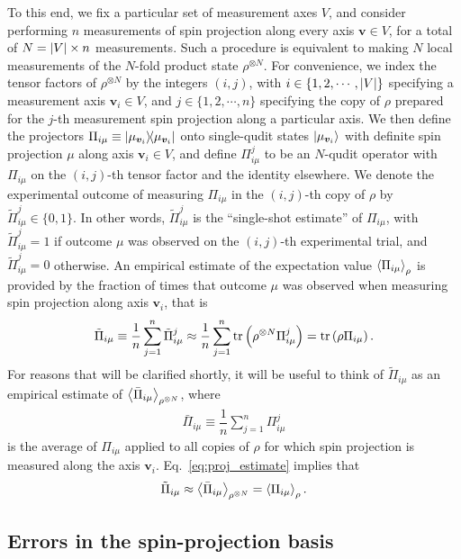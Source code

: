 \documentclass[a4paper,twocolumn,unpublished]{quantumarticle}
\newcommand{\f}[2]{\dfrac{#1}{#2}} %
\newcommand{\p}[1]{\left(#1\right)} %
\newcommand{\bk}{\Braket} %
\renewcommand{\set}[1]{\{#1\}} %
\begin{document}
To this end, we fix a particular set of measurement axes $V$, and consider performing $n$ measurements of spin projection along every axis $\bm v\in V$, for a total of $N=\abs{V}\times n$ measurements.
Such a procedure is equivalent to making $N$ local measurements of the $N$-fold product state $\rho^{\otimes N}$.
For convenience, we index the tensor factors of $\rho^{\otimes N}$ by the integers $\p{i,j}$, with $i\in\set{1,2,\cdots,\abs{V}}$ specifying a measurement axis $\bm v_i\in V$, and $j\in\set{1,2,\cdots,n}$ specifying the copy of $\rho$ prepared for the $j$-th measurement spin projection along a particular axis.
We then define the projectors $\Pi_{i\mu}\equiv\op{\mu_{\bm v_i}}$ onto single-qudit states $\ket{\mu_{\bm v_i}}$ with definite spin projection $\mu$ along axis $\bm v_i\in V$, and define $\Pi_{i\mu}^j$ to be an $N$-qudit operator with $\Pi_{i\mu}$ on the $\p{i,j}$-th tensor factor and the identity elsewhere.
We denote the experimental outcome of measuring $\Pi_{i\mu}$ in the $\p{i,j}$-th copy of $\rho$ by $\tilde\Pi_{i\mu}^j\in\set{0,1}$.
In other words, $\tilde\Pi_{i\mu}^j$ is the ``single-shot estimate'' of $\Pi_{i\mu}$, with $\tilde\Pi_{i\mu}^j=1$ if outcome $\mu$ was observed on the $\p{i,j}$-th experimental trial, and $\tilde\Pi_{i\mu}^j=0$ otherwise.
An empirical estimate of the expectation value $\bk{\Pi_{i\mu}}_\rho$ is provided by the fraction of times that outcome $\mu$ was observed when measuring spin projection along axis $\bm v_i$, that is
\begin{align}
  \tilde\Pi_{i\mu} \equiv \f1n \sum_{j=1}^n \tilde\Pi_{i\mu}^j
  \approx \f1n \sum_{j=1}^n \tr\p{\rho^{\otimes N} \Pi_{i\mu}^j}
  = \tr\p{\rho \Pi_{i\mu}}.
  \label{eq:proj_estimate}
\end{align}
For reasons that will be clarified shortly, it will be useful to think of $\tilde\Pi_{i\mu}$ as an empirical estimate of $\bk{\bar\Pi_{i\mu}}_{\rho^{\otimes N}}$, where
\begin{align}
  \bar\Pi_{i\mu} \equiv \f1n \sum_{j=1}^n \Pi_{i\mu}^j
  \label{eq:mean_proj}
\end{align}
is the average of $\Pi_{i\mu}$ applied to all copies of $\rho$ for which spin projection is measured along the axis $\bm v_i$.
Eq.~\eqref{eq:proj_estimate} implies that
\begin{align}
  \tilde\Pi_{i\mu}
  \approx \bk{\bar\Pi_{i\mu}}_{\rho^{\otimes N}}
  = \bk{\Pi_{i\mu}}_\rho.
\end{align}

\subsection{Errors in the spin-projection basis}
\end{document}
